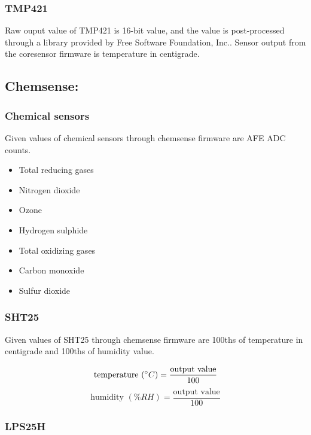 \subsubsection{ TMP421}

Raw ouput value of TMP421 is 16-bit value, and the value is post-processed through a library provided by Free Software Foundation, Inc.. Sensor output from the coresensor firmware is temperature in centigrade.


\subsection{Chemsense:}
\subsubsection{ Chemical sensors}

Given values of chemical sensors through chemsense firmware are AFE ADC counts.

\begin{itemize}
  \item Total reducing gases
  \item Nitrogen dioxide
  \item Ozone
  \item Hydrogen sulphide
  \item Total oxidizing gases
  \item Carbon monoxide
  \item Sulfur dioxide
\end{itemize}


\subsubsection{ SHT25}

Given values of SHT25 through chemsense firmware are 100ths of temperature in centigrade and 100ths of humidity value.

{\centering
 \[ \text{temperature }(\degree C) = \frac{\text{output value}}{100} \]
 \[ \text{humidity }(\% RH) = \frac{\text{output value}}{100} \]
 \par
 }

\subsubsection{ LPS25H}

